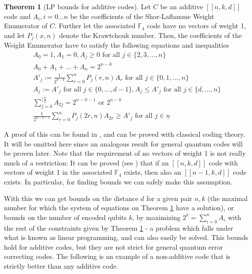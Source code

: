 \documentclass[12pt,a4paper,BCOR15mm,twoside,DIV12]{article}
\def\F{\mathbb{F}}
\def\n{\underline{n}}
\def\fa{\text{ for all }}
\theoremstyle{definition}
\newtheorem{theorem}[Satz]{Theorem}
\begin{document}
\begin{theorem}[LP bounds for additive codes]\label{lpadditive}
Let $C$ be an additive $[[n,k,d]]$ code and $A_i, i = 0 \ldots n$ be the coefficients of the Shor-Laflamme Weight Enumerator of $C$. Further let the associated $\F_4$ code have no vectors of weight 1, 
and let $P_j(x,n)$ denote the Krawtchouk number.  Then, the coefficients of the Weight Enumerator have to satisfy the following equations and inequalities
\begin{align} 
A_0 = 1, A_1 = 0, A_j \geq 0 \text{ for all } j \in \{ 2,3, \ldots, n \} \\
A_0 + A_1 + \ldots + A_n = 2^{n-k} \\
A'_j := \frac{1}{2^{n-k}} \sum_{r = 0}^n P_j(r,n) A_r  \text{ for all } j \in \{ 0,1, \ldots, n \} \\
A_j := A'_j \text{ for all } j \in \{0, \ldots, d-1 \}, A_j \leq A'_j \fa j \in \{d, \ldots, n \} \\
\sum_{j=0}^{\lfloor{\frac{n}{2}}} A_{2j} = 2^{n-k-1} \text{ or } 2^{n-k} \\
\frac{1}{2^{n-k-1}} \sum_{r=0}^n P_j(2r,n)A_{2r} \geq A'_j \fa j \in \n
\end{align}

A proof of this can be found in \cite{gf4}, and can be proved with classical coding theory. It will be omitted here since an analogous result for general quantum codes will be proven later.
Note that the requirement of no vectors of weight 1 is not really much of a restriction: It can be proved (see \cite{gf4}) that if an $[[n,k,d]]$ code with vectors of weight 1 in the associated $\F_4$ exists,
then also an $[[n-1,k,d]]$ code exists. In particular, for finding bounds we can safely make this assumption.
\end{theorem}

With this we can get bounds on the distance $d$ for a given pair $n,k$ (the maximal number for which the system of equations on Theorem \ref{lpadditive} have a solution), or bounds on the number of encoded qubits $k$, 
by maximizing $2^k = \sum_{i=0}^n A_i$ with the rest of the constraints given by Theorem \ref{lpadditive} - a problem which falls under what is known as linear programming, and can also easily be solved.
This bounds hold for additive codes, but they are not strict for general quantum error correcting codes. The following is an example of a non-additive code that is strictly better than any additive code.
\end{document}
